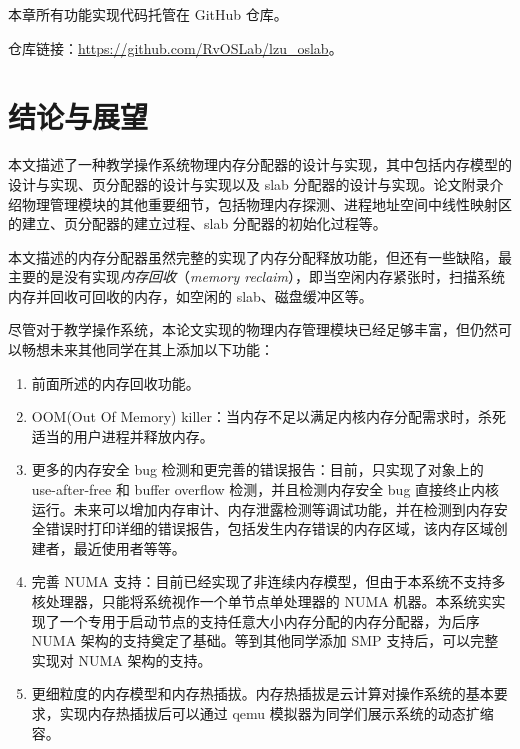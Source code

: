 \documentclass[AutoFakeBold]{LZUThesis}
\begin{document}
\begin{sloppypar}
本章所有功能实现代码托管在 GitHub 仓库。

仓库链接：\href{https://github.com/RvOSLab/lzu_oslab}{https://github.com/RvOSLab/lzu\_oslab}。

\chapter{结论与展望}

本文描述了一种教学操作系统物理内存分配器的设计与实现，其中包括内存模型的设计与实现、页分配器的设计与实现以及
slab
分配器的设计与实现。论文附录介绍物理管理模块的其他重要细节，包括物理内存探测、进程地址空间中线性映射区的建立、页分配器的建立过程、slab
分配器的初始化过程等。

本文描述的内存分配器虽然完整的实现了内存分配释放功能，但还有一些缺陷，最主要的是没有实现\emph{内存回收}（\emph{memory
reclaim}），即当空闲内存紧张时，扫描系统内存并回收可回收的内存，如空闲的
slab、磁盘缓冲区等。

尽管对于教学操作系统，本论文实现的物理内存管理模块已经足够丰富，但仍然可以畅想未来其他同学在其上添加以下功能：

\begin{enumerate}
\def\labelenumi{\arabic{enumi}.}
\item
  前面所述的内存回收功能。
\item
  OOM(Out Of Memory)
  killer：当内存不足以满足内核内存分配需求时，杀死适当的用户进程并释放内存。
\item
  更多的内存安全 bug 检测和更完善的错误报告：目前，只实现了对象上的
  use-after-free 和 buffer overflow 检测，并且检测内存安全 bug
  直接终止内核运行。未来可以增加内存审计、内存泄露检测等调试功能，并在检测到内存安全错误时打印详细的错误报告，包括发生内存错误的内存区域，该内存区域创建者，最近使用者等等。
\item
  完善 NUMA
  支持：目前已经实现了非连续内存模型，但由于本系统不支持多核处理器，只能将系统视作一个单节点单处理器的
  NUMA
  机器。本系统实实现了一个专用于启动节点的支持任意大小内存分配的内存分配器，为后序
  NUMA 架构的支持奠定了基础。等到其他同学添加 SMP 支持后，可以完整实现对
  NUMA 架构的支持。
\item
  更细粒度的内存模型和内存热插拔。内存热插拔是云计算对操作系统的基本要求，实现内存热插拔后可以通过
  qemu 模拟器为同学们展示系统的动态扩缩容。
\end{enumerate}





\backmatter


\printbib
\nocite{*} %







\end{sloppypar}
\end{document}
